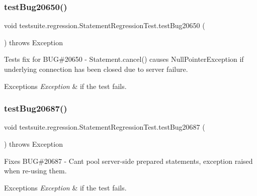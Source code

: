 \subsubsection{\texorpdfstring{test\+Bug20650()}{testBug20650()}}
{\footnotesize\ttfamily void testsuite.\+regression.\+Statement\+Regression\+Test.\+test\+Bug20650 (\begin{DoxyParamCaption}{ }\end{DoxyParamCaption}) throws Exception}

Tests fix for B\+UG\#20650 -\/ Statement.\+cancel() causes Null\+Pointer\+Exception if underlying connection has been closed due to server failure.


\begin{DoxyExceptions}{Exceptions}
{\em Exception} & if the test fails. \\
\hline
\end{DoxyExceptions}
\mbox{\label{classtestsuite_1_1regression_1_1_statement_regression_test_a0267fce90c408fe4f218251a41707fdc}} 
\subsubsection{\texorpdfstring{test\+Bug20687()}{testBug20687()}}
{\footnotesize\ttfamily void testsuite.\+regression.\+Statement\+Regression\+Test.\+test\+Bug20687 (\begin{DoxyParamCaption}{ }\end{DoxyParamCaption}) throws Exception}

Fixes B\+UG\#20687 -\/ Can\textquotesingle{}t pool server-\/side prepared statements, exception raised when re-\/using them.


\begin{DoxyExceptions}{Exceptions}
{\em Exception} & if the test fails. \\
\hline
\end{DoxyExceptions}
\mbox{\label{classtestsuite_1_1regression_1_1_statement_regression_test_a1c0e3e171ebbd64605711647d9b930c0}} 

